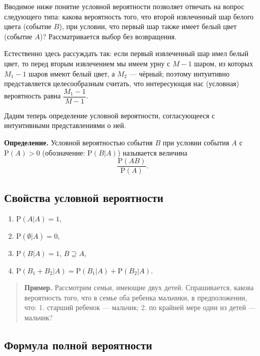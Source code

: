 \documentclass[11pt,a4paper]{article}
\providecommand{\tightlist}{%
      \setlength{\itemsep}{0pt}\setlength{\parskip}{0pt}}
\begin{document}
Вводимое ниже понятие условной вероятности позволяет отвечать на вопрос
следующего типа: какова вероятность того, что второй извлеченный шар
белого цвета (событие \(B\)), при условии, что первый шар также имеет
белый цвет (событие \(A\))? Рассматривается выбор без возвращения.

Естественно здесь рассуждать так: если первый извлеченный шар имел белый
цвет, то перед вторым извлечением мы имеем урну с \(M-1\) шаром, из
которых \(M_1 - 1\) шаров имеют белый цвет, а \(M_2\) --- чёрный;
поэтому интуитивно представляется целесообразным считать, что
интересующая нас (условная) вероятность равна \(\dfrac{M_1-1}{M-1}\).

Дадим теперь определение условной вероятности, согласующееся с
интуитивными представлениями о ней.

\textbf{Определение.} Условной вероятностью события \(B\) при условии
события \(A\) с \(\mathrm{P}(A)>0\) (обозначение: \(\mathrm{P}(B|A)\))
называется величина \[ \dfrac{\mathrm{P}(AB)}{\mathrm{P}(A)}. \]

    \hypertarget{ux441ux432ux43eux439ux441ux442ux432ux430-ux443ux441ux43bux43eux432ux43dux43eux439-ux432ux435ux440ux43eux44fux442ux43dux43eux441ux442ux438}{%
\subsection{Свойства условной
вероятности}\label{ux441ux432ux43eux439ux441ux442ux432ux430-ux443ux441ux43bux43eux432ux43dux43eux439-ux432ux435ux440ux43eux44fux442ux43dux43eux441ux442ux438}}

\begin{enumerate}
\def\labelenumi{\arabic{enumi}.}
\tightlist
\item
  \(\mathrm{P}(A|A) = 1\),
\item
  \(\mathrm{P}(\emptyset|A) = 0\),
\item
  \(\mathrm{P}(B|A) = 1\), \(B \supseteq A\),
\item
  \(\mathrm{P}(B_1 + B_2|A) = \mathrm{P}(B_1|A) + \mathrm{P}(B_2|A)\).
\end{enumerate}

\begin{quote}
\textbf{Пример.} Рассмотрим семьи, имеющие двух детей. Спрашивается,
какова вероятность того, что в семье оба ребенка мальчики, в
предположении, что: 1. старший ребенок --- мальчик; 2. по крайней мере
один из детей --- мальчик?
\end{quote}

    \hypertarget{ux444ux43eux440ux43cux443ux43bux430-ux43fux43eux43bux43dux43eux439-ux432ux435ux440ux43eux44fux442ux43dux43eux441ux442ux438}{%
\subsection{Формула полной
вероятности}\label{ux444ux43eux440ux43cux443ux43bux430-ux43fux43eux43bux43dux43eux439-ux432ux435ux440ux43eux44fux442ux43dux43eux441ux442ux438}}
\end{document}
